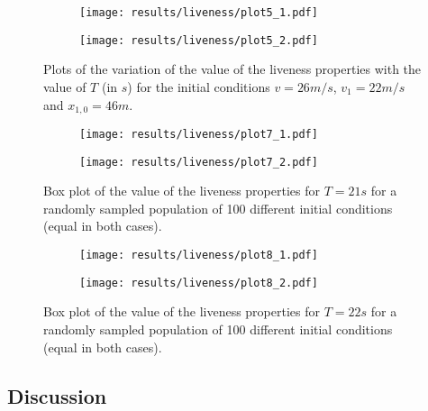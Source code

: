 \begin{figure}[H]
\centering
\begin{subfigure}{0.49\textwidth}
  \centering
  \texttt{[image: results/liveness/plot5\_1.pdf]}
\end{subfigure}
\begin{subfigure}{0.49\textwidth}
  \centering
  \texttt{[image: results/liveness/plot5\_2.pdf]}
\end{subfigure} 
\caption{Plots of the variation of the value of the liveness properties with the value of $T$ (in $s$) for the initial conditions $v = 26m/s$, $v_1 = 22m/s$ and $x_{1,0} = 46m$.}
\label{fig:plot5}
\end{figure}

\begin{figure}[H]
\vspace{4em}
\centering
\begin{subfigure}{0.49\textwidth}
  \centering
  \texttt{[image: results/liveness/plot7\_1.pdf]}
\end{subfigure}
\begin{subfigure}{0.49\textwidth}
  \centering
  \texttt{[image: results/liveness/plot7\_2.pdf]}
\end{subfigure} 
\caption{Box plot of the value of the liveness properties for $T = 21s$ for a randomly sampled population of 100 different initial conditions (equal in both cases).}
\label{fig:plot7}
\end{figure}

\begin{figure}[H]
\centering
\begin{subfigure}{0.49\textwidth}
  \centering
  \texttt{[image: results/liveness/plot8\_1.pdf]}
\end{subfigure}
\begin{subfigure}{0.49\textwidth}
  \centering
  \texttt{[image: results/liveness/plot8\_2.pdf]}
\end{subfigure} 
\caption{Box plot of the value of the liveness properties for $T = 22s$ for a randomly sampled population of 100 different initial conditions (equal in both cases).}
\label{fig:plot8}
\end{figure}

\subsection{Discussion}

